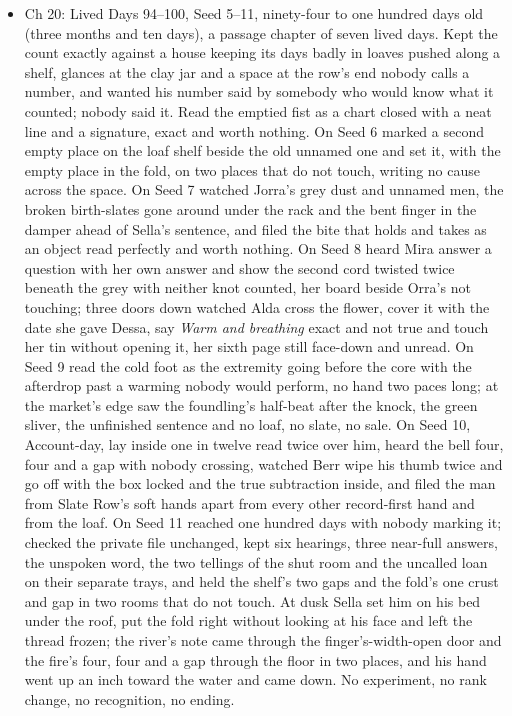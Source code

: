 \documentclass{design/chronicle}
\begin{document}
{\begin{itemize}[leftmargin=1.4em,itemsep=1pt,topsep=3pt,parsep=0pt]
\end{itemize}

\begin{itemize}[leftmargin=1.4em,itemsep=1pt,topsep=3pt,parsep=0pt]

\item Ch 20: Lived Days 94–100, Seed 5–11, ninety-four to one hundred days old (three months and ten days), a passage chapter of seven lived days. Kept the count exactly against a house keeping its days badly in loaves pushed along a shelf, glances at the clay jar and a space at the row’s end nobody calls a number, and wanted his number said by somebody who would know what it counted; nobody said it. Read the emptied fist as a chart closed with a neat line and a signature, exact and worth nothing. On Seed 6 marked a second empty place on the loaf shelf beside the old unnamed one and set it, with the empty place in the fold, on two places that do not touch, writing no cause across the space. On Seed 7 watched Jorra’s grey dust and unnamed men, the broken birth-slates gone around under the rack and the bent finger in the damper ahead of Sella’s sentence, and filed the bite that holds and takes as an object read perfectly and worth nothing. On Seed 8 heard Mira answer a question with her own answer and show the second cord twisted twice beneath the grey with neither knot counted, her board beside Orra’s not touching; three doors down watched Alda cross the flower, cover it with the date she gave Dessa, say \emph{Warm and breathing} exact and not true and touch her tin without opening it, her sixth page still face-down and unread. On Seed 9 read the cold foot as the extremity going before the core with the afterdrop past a warming nobody would perform, no hand two paces long; at the market’s edge saw the foundling’s half-beat after the knock, the green sliver, the unfinished sentence and no loaf, no slate, no sale. On Seed 10, Account-day, lay inside one in twelve read twice over him, heard the bell four, four and a gap with nobody crossing, watched Berr wipe his thumb twice and go off with the box locked and the true subtraction inside, and filed the man from Slate Row’s soft hands apart from every other record-first hand and from the loaf. On Seed 11 reached one hundred days with nobody marking it; checked the private file unchanged, kept six hearings, three near-full answers, the unspoken word, the two tellings of the shut room and the uncalled loan on their separate trays, and held the shelf’s two gaps and the fold’s one crust and gap in two rooms that do not touch. At dusk Sella set him on his bed under the roof, put the fold right without looking at his face and left the thread frozen; the river’s note came through the finger’s-width-open door and the fire’s four, four and a gap through the floor in two places, and his hand went up an inch toward the water and came down. No experiment, no rank change, no recognition, no ending.

\end{itemize}
}
\end{document}
